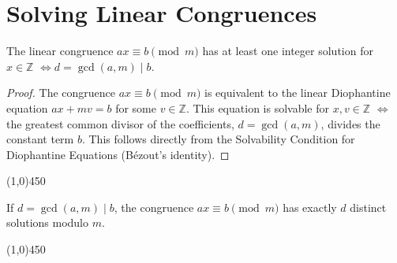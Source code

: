\section{Solving Linear Congruences}

\begin{proposition}
The linear congruence $a x \equiv b \pmod{m}$ has at least one integer solution for $x \in \mathbb{Z}$ $\iff d = \gcd(a, m) \mid b$.
\end{proposition}
\begin{proof}
The congruence $a x \equiv b \pmod{m}$ is equivalent to the linear Diophantine equation $a x + m v = b$ for some $v \in \mathbb{Z}$.
This equation is solvable for $x, v \in \mathbb{Z}$ $\iff$ the greatest common divisor of the coefficients, $d = \gcd(a, m)$, divides the constant term $b$. This follows directly from the Solvability Condition for Diophantine Equations (Bézout's identity). \qedhere
\end{proof}

\begin{center}
    \line(1,0){450}
\end{center}

\begin{proposition}
If $d = \gcd(a, m) \mid b$, the congruence $a x \equiv b \pmod{m}$ has exactly $d$ distinct solutions modulo $m$.
\end{proposition}

\begin{center}
    \line(1,0){450}
\end{center}